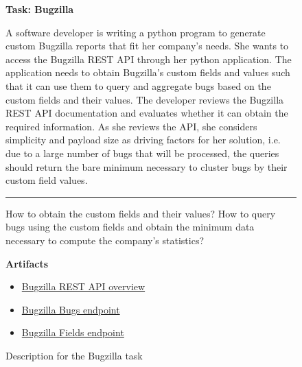 \begin{figure}
\begin{mdframed}[backgroundcolor=gray!04] 
\begin{scriptsize}

{\large \textbf{Task: Bugzilla}} \bigskip


A software developer is writing a python program to generate custom Bugzilla reports that fit her company's needs. She wants to access the Bugzilla REST API through her python application.
The application needs to obtain Bugzilla's custom fields and values such that it can use them to query and aggregate bugs based on the custom fields and their values. The developer reviews the Bugzilla REST API documentation and evaluates whether it can obtain the required information. As she reviews the API, she considers simplicity and payload size as driving factors for her solution, i.e. due to a large number of bugs that will be processed, the queries should return the bare minimum necessary to cluster bugs by their custom field values.


\begin{center}
\rule{10cm}{0.4pt}
\end{center}

How to obtain the custom fields and their values? How to query bugs using the custom
fields and obtain the minimum data necessary to compute the company's statistics?

\medskip

\textbf{Artifacts}

\begin{itemize}
    \item \href{https://bugzilla.readthedocs.io/en/latest/api/core/v1/general.html}{Bugzilla REST API overview}
    \item \href{https://bugzilla.readthedocs.io/en/latest/api/core/v1/bug.html}{Bugzilla Bugs endpoint}
    \item \href{https://bugzilla.readthedocs.io/en/latest/api/core/v1/field.html}{Bugzilla Fields endpoint}
\end{itemize}

\end{scriptsize}
\end{mdframed}
\caption{Description for the Bugzilla task}
\end{figure}

    
